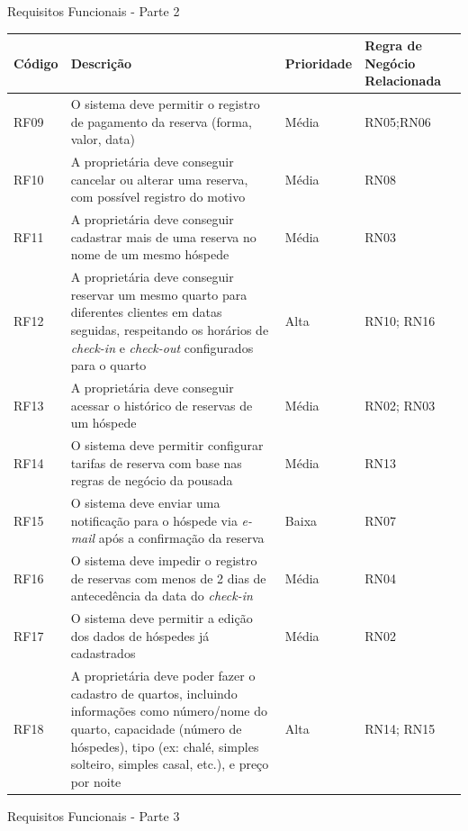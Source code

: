 \documentclass[
	12pt,				%
	openany,			%
	oneside,			%
	a4paper,			%
	english,			%
	french,				%
	spanish,			%
	brazil				%
	]{abntex2}
\begin{document}
\begin{apendicesenv}
\begin{quadro}[H]
	\caption{Requisitos Funcionais - Parte 2}
	\label{quadro_rfc2}
	\begin{tabular}{|>{\centering\arraybackslash}p{1.5cm}|p{6.7cm}|>{\centering\arraybackslash}p{2cm}|>{\centering\arraybackslash}p{4cm}|}
		\hline
		\textbf{Código} & \textbf{Descrição} & \textbf{Prioridade} & \textbf{Regra de Negócio Relacionada} \\ \hline
		RF09 & O sistema deve permitir o registro de pagamento da reserva (forma, valor, data) & Média & RN05;RN06 
		\\ \hline
		RF10 & A proprietária deve conseguir cancelar ou alterar uma reserva, com possível registro do motivo & Média & RN08 \\ \hline
		RF11 & A proprietária deve conseguir cadastrar mais de uma reserva no nome de um mesmo hóspede & Média & RN03
		\\ \hline
		RF12 & A proprietária deve conseguir reservar um mesmo quarto para diferentes clientes em datas seguidas, respeitando os horários de \textit{check-in} e \textit{check-out} configurados para o quarto & Alta & RN10; RN16
		\\ \hline
		RF13 & A proprietária deve conseguir acessar o histórico de reservas de um hóspede & Média & RN02; RN03  
		\\ \hline
		RF14 & O sistema deve permitir configurar tarifas de reserva com base nas regras de negócio da pousada & Média & RN13 
		\\ \hline
		RF15 & O sistema deve enviar uma notificação para o hóspede via \textit{e-mail} após a confirmação da reserva & Baixa & RN07
		 \\ \hline
		RF16 & O sistema deve impedir o registro de reservas com menos de 2 dias de antecedência da data do \textit{check-in} & Média & RN04
		 \\ \hline
		RF17 & O sistema deve permitir  a edição dos dados de hóspedes já cadastrados & Média & RN02
		 \\ \hline 
		RF18 & A proprietária deve poder fazer o cadastro de quartos, incluindo informações como número/nome do quarto, capacidade (número de hóspedes), tipo (ex: chalé, simples solteiro, simples casal, etc.), e preço por noite & Alta & RN14; RN15
		\\ \hline
	\end{tabular}
\end{quadro}
\begin{quadro}[H]
	\caption{Requisitos Funcionais - Parte 3}

\end{quadro}
\end{apendicesenv}
\end{document}
